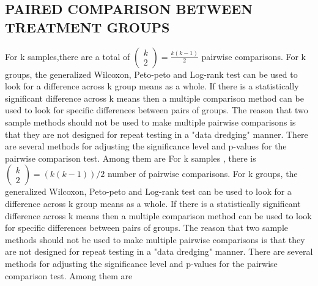 \documentclass[11pt]{article}
\numberwithin{figure}{section}
\begin{document}
\subsection{PAIRED    COMPARISON BETWEEN TREATMENT  GROUPS}
For k samples,there are a total of $\left( 
\begin{array}{c} 
k\\ 
2 
\end{array} 
\right) =\frac{k(k-1)}{2}$ 
 pairwise comparisons. For k groups, the generalized Wilcoxon, Peto-peto and Log-rank test can be used to look for a difference across k group means as a whole. If there is a statistically significant difference across k means then a multiple comparison method can be used to look for specific differences between pairs of groups. The reason that two sample methods should not be used to make multiple pairwise comparisons is that they are not designed for repeat testing in a "data dredging" manner.
There are several methods for adjusting the significance level and p-values for the pairwise comparison test. Among them are 
For k samples , there is $\left( 
\begin{array}{c} 
k\\ 
2 
\end{array} 
\right)=    (k(k-1))/2$ number of pairwise comparisons. For k groups, the generalized Wilcoxon, Peto-peto and Log-rank test can be used to look for a difference across k group means as a whole. If there is a statistically significant difference across k means then a multiple comparison method can be used to look for specific differences between pairs of groups. The reason that two sample methods should not be used to make multiple pairwise comparisons is that they are not designed for repeat testing in a "data dredging" manner.
There are several methods for adjusting the significance level and p-values for the pairwise comparison test. Among them are 
\end{document}
